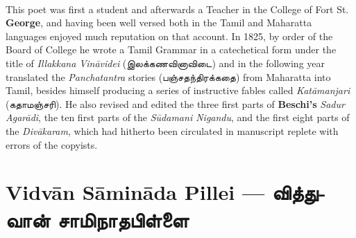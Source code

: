 \documentclass{article}
\newcommand{\TamilText}[1]{\texttamil{#1}}
\newcommand{\TamilBold}[1]{\texttamil{\textbf{#1}}}
\newcommand{\tam}[1]{\TamilText{#1}}
\newcommand{\tambold}[1]{\TamilBold{#1}}
\begin{document}
 \paragraph{}
This poet was first a student and afterwards a Teacher in the College of Fort St. \textbf{George}, and having been well versed both in the Tamil and Maharatta languages enjoyed much reputation on that account. In 1825, by order of the Board of College he wrote a Tamil Grammar in a catechetical form under the title of \emph{Illakkana Vin\={a}videi} (\tam{இலக்கணவினாவிடை}) and in the following year translated the \emph{Panchatantra} stories (\tam{பஞ்சதந்திரக்கதை}) from Maharatta into Tamil, besides himself producing a series of instructive fables called \emph{Kat\={a}manjari} (\tam{கதாமஞ்சரி}). He also revised and edited the three first parts of \textbf{Beschi's} \emph{Sadur Agar\={a}di}, the ten first parts of the \emph{S\={u}damani Nigandu}, and the first eight parts of the \emph{Div\={a}karam}, which had hitherto been circulated in manuscript replete with errors of the copyists.

\section{Vidv\={a}n S\={a}min\={a}da Pillei --- \tambold{வித்துவான் சாமிநாதபிள்ளை}}
\end{document}
